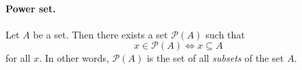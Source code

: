 \documentclass[12pt,notitlepage]{article}
\theoremstyle{plain}
\theoremstyle{definition}
\theoremstyle{plain}
\newcommand{\N}{\mathbb{N}}
\newcommand{\Z}{\mathbb{Z}}
\newcommand{\sbs}{\subseteq}
\newcommand{\void}{\varnothing}
\newcommand{\mP}{\mathcal{P}}
\renewcommand{\phi}{\varphi}
\newcommand{\1}{\mathbf{1}}
\newcommand{\0}{\mathbf{0}}
\begin{document}
%
%
%
%
%

\paragraph{Power set.} Let $A$ be a set. Then there exists a set $\mP(A)$ such that
$$x \in \mP(A) \iff x \sbs A$$
for all $x$. In other words, $\mP(A)$ is the set of all \emph{subsets} of the set $A$.
\end{document}
